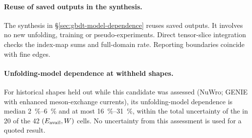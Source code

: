 \paragraph{Reuse of saved outputs in the synthesis.} The synthesis in \S\ref{sec:gbdt-model-dependence} reuses saved outputs. It involves no new unfolding, training or pseudo-experiments. Direct tensor-slice integration checks the index-map sums and full-domain rate. Reporting boundaries coincide with fine edges.

\paragraph{Unfolding-model dependence at withheld shapes.} For historical shapes held out while this candidate was assessed (NuWro; GENIE with enhanced meson-exchange currents), its unfolding-model dependence is median \SIrange{2}{6}{\percent} and at most \SIrange{16}{31}{\percent}, within the total uncertainty of the \resFiveAxis{} in 20 of the 42 $(E_{\mathrm{avail}},W)$ cells. No uncertainty from this assessment is used for a quoted result.

